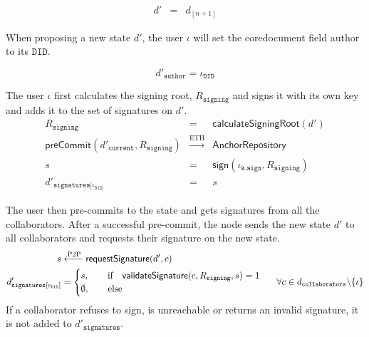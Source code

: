 \begin{eqnarray}
    d' & = & d_{[n+1]}
\end{eqnarray}

When proposing a new state $d'$, the user $\iota$ will set the coredocument field author to its $\mathtt{DID}$.

\begin{equation}
    {d'}_{\mathtt{author}} = \iota_{\mathtt{DID}}
\end{equation}

The user $\iota$ first calculates the signing root, $R_{\mathtt{signing}}$ and signs it with its own key and adds it to the set of signatures on $d'$.
\begin{eqnarray}
    R_{\mathtt{signing}} & = & \mathsf{calculateSigningRoot}(d') \\
        \mathsf{preCommit}(d'_\mathtt{current},R_{\mathtt{signing}}) &\xrightarrow[]{\text{ETH}} &  \mathsf{AnchorRepository} \\
     s & = & \mathsf{sign}(\iota_{\mathtt{k.sign}}, R_{\mathtt{signing}}) \\
    {d'}_{\mathtt{signatures}[\iota_{\mathtt{DID}]}} & = & s
\end{eqnarray}

The user then pre-commits to the state and gets signatures from all the collaborators. After a successful pre-commit, the node sends the new state $d'$ to all collaborators and requests their signature on the new state.
\begin{equation}
\begin{split}
s & \xleftarrow[]{\text{P2P}} \mathsf{requestSignature}(d', c) \qquad \qquad \qquad \\
d'_{\mathtt{signatures}[c_{\mathtt{DID}}]} & =  \begin{cases}
  s, \quad \quad \text{if} \quad \mathsf{validateSignature}(c, R_{\mathtt{signing}}, s)  = 1 \\      
  \emptyset,  \quad\quad\text{else} \\
\end{cases} \textcolor{white}{x}\forall c \in d_{\mathtt{collaborators}} \backslash \{\iota\}
\end{split}
\end{equation}
If a collaborator refuses to sign, is unreachable or returns an invalid signature, it is not added to $d'_{\mathtt{signatures}}$. 
\begin{comment}
\begin{eqnarray}
    R_{\mathtt{doc-root}} = \mathsf{calculateDocumentRoot}(d') \\
    \mathsf{commit}(d'_{\mathtt{next-img}}, R_{\mathtt{doc-root}},M_{\texttt{proofs}}) \xrightarrow[]{\text{ETH}} \mathsf{AnchorRepository}
\end{eqnarray}
\end{comment}
